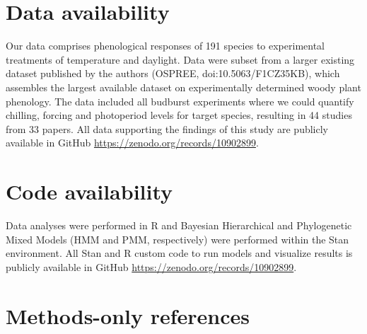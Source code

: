 \documentclass[11pt]{article}
\begin{document}
\section*{Data availability}
Our data comprises phenological responses of 191 species to experimental treatments of temperature and daylight. Data were subset from a larger existing dataset published by the authors (OSPREE, doi:10.5063/F1CZ35KB), which assembles the largest available dataset on experimentally determined woody plant phenology. The data included all budburst experiments where we could quantify chilling, forcing and photoperiod levels for target species, resulting in 44 studies from 33 papers. All data supporting the findings of this study are publicly available in GitHub \url{https://zenodo.org/records/10902899}.

\section*{Code availability}
Data analyses were performed in R and Bayesian Hierarchical and Phylogenetic Mixed Models (HMM and PMM, respectively) were performed within the Stan environment. All Stan and R custom code to run models and visualize results is publicly available in GitHub \url{https://zenodo.org/records/10902899}.

\clearpage
\section*{Methods-only references} 
%
%
\end{document}
